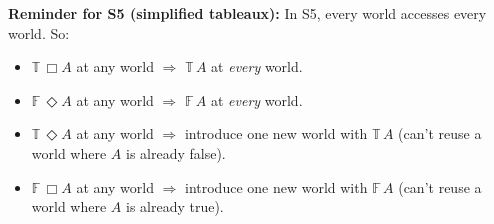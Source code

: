\documentclass[10pt]{article}
\newcommand{\T}{\mathbb{T}}
\newcommand{\F}{\mathbb{F}}
\begin{document}
\bigskip

\textbf{Reminder for S5 (simplified tableaux):} In S5, every world accesses every world. So:
\begin{itemize}[nosep]
\item $\T\, \Box A$ at any world $\Rightarrow$ $\T\, A$ at \emph{every} world.
\item $\F\, \Diamond A$ at any world $\Rightarrow$ $\F\, A$ at \emph{every} world.
\item $\T\, \Diamond A$ at any world $\Rightarrow$ introduce one new world with $\T\, A$ (can't reuse a world where $A$ is already false).
\item $\F\, \Box A$ at any world $\Rightarrow$ introduce one new world with $\F\, A$ (can't reuse a world where $A$ is already true).
\end{itemize}
\end{document}
